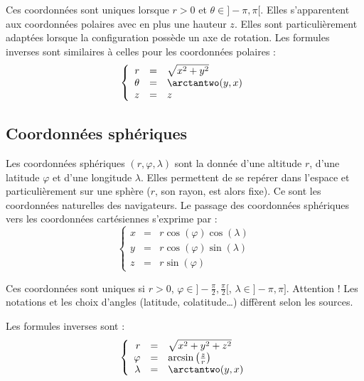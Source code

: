 \documentclass[11pt,class=report,crop=false]{standalone}
\begin{document}

Ces coordonnées sont uniques lorsque $r>0$ et $\theta \in {}]-\pi,\pi[$.
Elles s'apparentent aux coordonnées polaires avec en plus une hauteur $z$. Elles sont particulièrement adaptées lorsque la configuration possède un axe de rotation.
Les formules inverses sont similaires à celles pour les coordonnées polaires :
$$\left\{\begin{array}{rcl}
	r &=& \sqrt{x^2+y^2} \\
	\theta &=&  \arctantwo(y,x) \\
	z &=& z
\end{array}\right.$$



\subsection{Coordonnées sphériques}


Les coordonnées sphériques $(r, \varphi, \lambda)$ sont la donnée d'une altitude $r$, d'une latitude $\varphi$ et d'une longitude $\lambda$. Elles permettent de se repérer dans l'espace et particulièrement sur une sphère ($r$, son rayon, est alors fixe). Ce sont les coordonnées naturelles des navigateurs.
Le passage des coordonnées sphériques vers les coordonnées cartésiennes s'exprime par :
$$\left\{\begin{array}{rcl}
	x & = & r \cos(\varphi) \cos(\lambda) \\
	y & = & r \cos(\varphi) \sin(\lambda) \\
	z & = & r \sin(\varphi)
\end{array}\right.$$


Ces coordonnées sont uniques si $r>0$, $\varphi \in {}]-\frac\pi2,\frac\pi2[ $, $\lambda \in {}]-\pi,\pi]$.
Attention ! Les notations et les choix d'angles (latitude, colatitude\ldots) diffèrent selon les sources.

Les formules inverses sont :
$$\left\{\begin{array}{rcl}
	r &=& \sqrt{x^2+y^2+z^2} \\	
	\varphi &=& \arcsin\left(\frac z r\right) \\
    \lambda &=& \arctantwo(y,x) \\
\end{array}\right.$$
\end{document}
